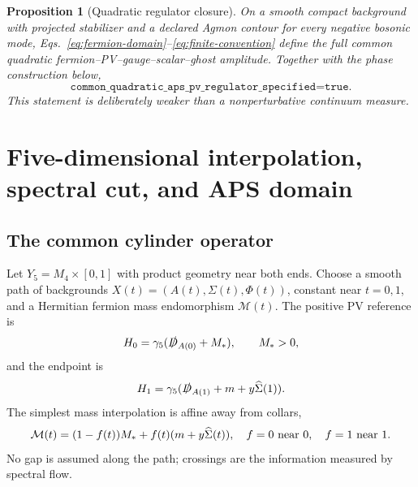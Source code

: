 \documentclass[11pt]{article}
\newtheorem{proposition}[theorem]{Proposition}
\theoremstyle{definition}
\theoremstyle{remark}
\begin{document}
\begin{proposition}[Quadratic regulator closure]
On a smooth compact background with projected stabilizer and a declared
Agmon contour for every negative bosonic mode,
Eqs.~\eqref{eq:fermion-domain}--\eqref{eq:finite-convention} define the full
common quadratic fermion--PV--gauge--scalar--ghost amplitude.  Together with
the phase construction below,
\begin{equation}
 \texttt{common\_quadratic\_aps\_pv\_regulator\_specified=true}.
 \label{eq:quadratic-regulator-true}
\end{equation}
This statement is deliberately weaker than a nonperturbative continuum
measure.
\end{proposition}

\section{Five-dimensional interpolation, spectral cut, and APS domain}

\subsection{The common cylinder operator}

Let \(Y_5=M_4\times[0,1]\) with product geometry near both ends.  Choose a
smooth path of backgrounds \(X(t)=(A(t),\Sigma(t),\Phi(t))\), constant near
\(t=0,1\), and a Hermitian fermion mass endomorphism \(\mathcal M(t)\).
The positive PV reference is
\begin{equation}
 H_0=\gamma_5(\slashed D_{A(0)}+M_*),\qquad M_*>0,
 \label{eq:positive-reference}
\end{equation}
and the endpoint is
\begin{equation}
 H_1=\gamma_5(\slashed D_{A(1)}+m+y\widehat\Sigma(1)).
 \label{eq:physical-endpoint}
\end{equation}
The simplest mass interpolation is affine away from collars,
\begin{equation}
 \mathcal M(t)=(1-f(t))M_*+f(t)(m+y\widehat\Sigma(t)),
 \quad f=0\ \hbox{near }0,\quad f=1\ \hbox{near }1.
 \label{eq:mass-interpolation}
\end{equation}
No gap is assumed along the path; crossings are the information measured by
spectral flow.
\end{document}
